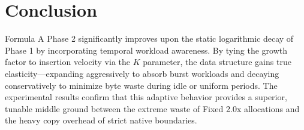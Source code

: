 \documentclass[11pt, a4paper]{article}
\begin{document}
\section{Conclusion}
Formula A Phase 2 significantly improves upon the static logarithmic decay of Phase 1 by incorporating temporal workload awareness. By tying the growth factor to insertion velocity via the $K$ parameter, the data structure gains true elasticity—expanding aggressively to absorb burst workloads and decaying conservatively to minimize byte waste during idle or uniform periods. The experimental results confirm that this adaptive behavior provides a superior, tunable middle ground between the extreme waste of Fixed 2.0x allocations and the heavy copy overhead of strict native boundaries.
\end{document}
